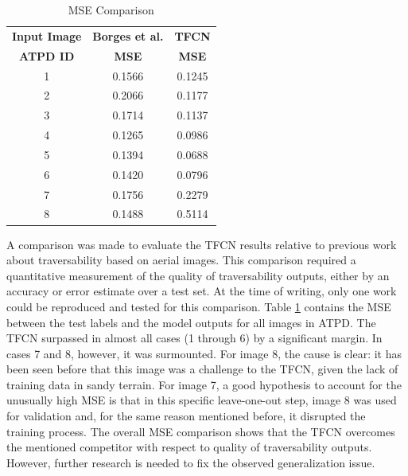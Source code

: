 \documentclass[conference]{IEEEtran}
\begin{document}
\begin{table}[htbp]
\begin{center}
\caption{MSE Comparison}
\begin{tabular}{|c|c c|}
\hline
\textbf{Input Image} & \textbf{Borges et al.\cite{borges:2019}} & \textbf{TFCN} \\
\textbf{ATPD ID} & \textbf{MSE} & \textbf{MSE} \\
\hline
1 & 0.1566 & \cellcolor{blue!15} 0.1245 \\ %
2 & 0.2066 & \cellcolor{blue!15} 0.1177 \\ %
3 & 0.1714 & \cellcolor{blue!15} 0.1137 \\ %
4 & 0.1265 & \cellcolor{blue!15} 0.0986 \\ %
5 & 0.1394 & \cellcolor{blue!15} 0.0688 \\ %
6 & 0.1420 & \cellcolor{blue!15} 0.0796 \\ %
7 & \cellcolor{blue!15} 0.1756 & 0.2279 \\ %
8 & \cellcolor{blue!15} 0.1488 & 0.5114 \\ \hline
\end{tabular}
\label{tab:comparison-mse}
\end{center}
\end{table}

A comparison was made to evaluate the TFCN results relative to previous work about traversability based on aerial images.
This comparison required a quantitative measurement of the quality of traversability outputs, either by an accuracy or error estimate over a test set.
At the time of writing, only one work \cite{borges:2019} could be reproduced and tested for this comparison.
Table \ref{tab:comparison-mse} contains the MSE between the test labels and the model outputs for all images in ATPD.
The TFCN surpassed \cite{borges:2019} in almost all cases (1 through 6) by a significant margin.
In cases 7 and 8, however, it was surmounted.
For image 8, the cause is clear: it has been seen before that this image was a challenge to the TFCN, given the lack of training data in sandy terrain.
For image 7, a good hypothesis to account for the unusually high MSE is that in this specific leave-one-out step, image 8 was used for validation and, for the same reason mentioned before, it disrupted the training process.
The overall MSE comparison shows that the TFCN overcomes the mentioned competitor with respect to quality of traversability outputs.
However, further research is needed to fix the observed generalization issue.
\end{document}
